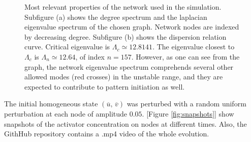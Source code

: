 \begin{figure}[H]
\centering
{}
\hfill
{}
\caption{ Most relevant properties of the network used in the simulation. Subfigure (a) shows the degree spectrum and the laplacian eigenvalue spectrum of the chosen graph. Network nodes are indexed by decreasing degree. Subfigure (b) shows the dispersion relation curve. Critical eigenvalue is $\Lambda_c \simeq 12.8141$. The eigenvalue closest to $\Lambda_c$ is $\Lambda_n \simeq 12.64$, of index $n=157$. However, as one can see from the graph, the network eigenvalue spectrum comprehends several other allowed modes (red crosses) in the unstable range, and they are expected to contribute to pattern initiation as well.}
\end{figure}
\noindent
The initial homogeneous state $(\overline{u},\,\overline{v})$ was perturbed with a random uniform perturbation at each node of amplitude $0.05$. [Figure \ref{fig:snapshots}] show snapshots of the activator concentration on nodes at different times. Also, the GithHub repository \cite{git} contains a .mp4 video of the whole evolution. 
